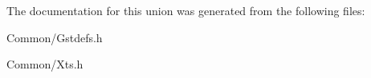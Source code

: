 The documentation for this union was generated from the following files\+:\begin{DoxyCompactItemize}
\item 
Common/Gstdefs.\+h\item 
Common/Xts.\+h\end{DoxyCompactItemize}
